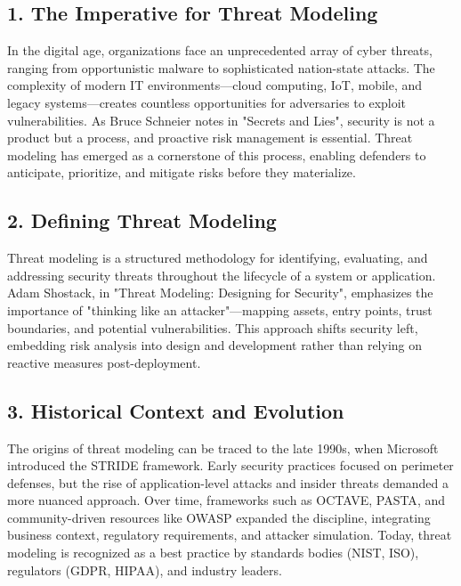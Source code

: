 
\subsection*{1. The Imperative for Threat Modeling}
In the digital age, organizations face an unprecedented array of cyber threats, ranging from opportunistic malware to sophisticated nation-state attacks. The complexity of modern IT environments—cloud computing, IoT, mobile, and legacy systems—creates countless opportunities for adversaries to exploit vulnerabilities. As Bruce Schneier notes in "Secrets and Lies"\cite{schneier1999}, security is not a product but a process, and proactive risk management is essential. Threat modeling has emerged as a cornerstone of this process, enabling defenders to anticipate, prioritize, and mitigate risks before they materialize.

\subsection*{2. Defining Threat Modeling}
Threat modeling is a structured methodology for identifying, evaluating, and addressing security threats throughout the lifecycle of a system or application. Adam Shostack, in "Threat Modeling: Designing for Security"\cite{shostack2014}, emphasizes the importance of "thinking like an attacker"—mapping assets, entry points, trust boundaries, and potential vulnerabilities. This approach shifts security left, embedding risk analysis into design and development rather than relying on reactive measures post-deployment.

\subsection*{3. Historical Context and Evolution}
The origins of threat modeling can be traced to the late 1990s, when Microsoft introduced the STRIDE framework\cite{shostack2014}. Early security practices focused on perimeter defenses, but the rise of application-level attacks and insider threats demanded a more nuanced approach. Over time, frameworks such as OCTAVE\cite{nist800154}, PASTA\cite{uceda2015}, and community-driven resources like OWASP\cite{owasp} expanded the discipline, integrating business context, regulatory requirements, and attacker simulation. Today, threat modeling is recognized as a best practice by standards bodies (NIST, ISO), regulators (GDPR, HIPAA), and industry leaders.

